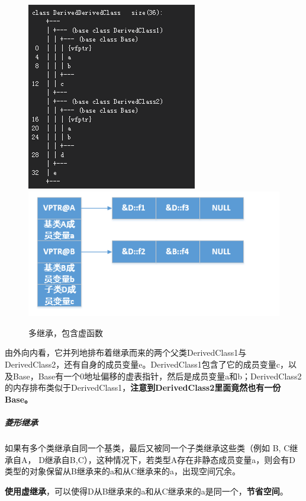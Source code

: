 \documentclass[UTF8,a4paper,12pt]{ctexbook} %
\begin{document}
			\begin{figure}[H]
				\centering
				\includegraphics[scale = 0.8]{figure/DerivedDerivedVirutal.png}
				\includegraphics[scale = 0.8]{vtable2.png}
				\caption{多继承，包含虚函数}
			\end{figure}
			
			由外向内看，它并列地排布着继承而来的两个父类DerivedClass1与DerivedClass2，还有自身的成员变量e。DerivedClass1包含了它的成员变量c，以及Base，Base有一个0地址偏移的虚表指针，然后是成员变量a和b；DerivedClass2的内存排布类似于DerivedClass1，\textbf{注意到DerivedClass2里面竟然也有一份Base。}
			
			\subparagraph{菱形继承}如果有多个类继承自同一个基类，最后又被同一个子类继承这些类（例如 B, C继承自A， D继承自B,C），这种情况下，若类型A存在非静态成员变量a，则会有D类型的对象保留从B继承来的a和从C继承来的a，出现空间冗余。 
			
			\textbf{使用虚继承}，可以使得D从B继承来的a和从C继承来的a是同一个，\textbf{节省空间}。 

		\newpage
\end{document}

